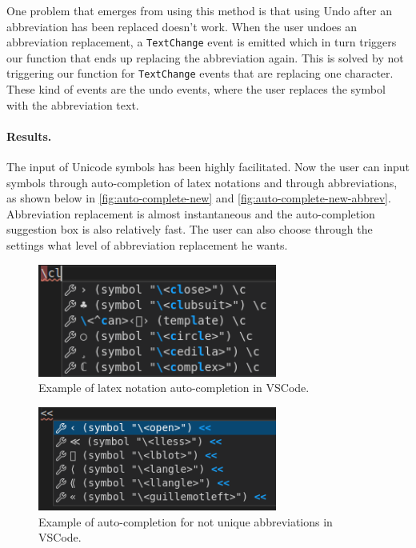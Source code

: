 One problem that emerges from using this method is that using Undo after an abbreviation has been replaced doesn't work. When the user undoes an abbreviation replacement, a \texttt{TextChange} event is emitted which in turn triggers our function that ends up replacing the abbreviation again. This is solved by not triggering our function for \texttt{TextChange} events that are replacing one character. These kind of events are the undo events, where the user replaces the symbol with the abbreviation text.

\paragraph{Results.}
The input of Unicode symbols has been highly facilitated. Now the user can input symbols through auto-completion of latex notations and through abbreviations, as shown below in \autoref{fig:auto-complete-new} and \autoref{fig:auto-complete-new-abbrev}. Abbreviation replacement is almost instantaneous and the auto-completion suggestion box is also relatively fast. The user can also choose through the settings what level of abbreviation replacement he wants.

\begin{figure}[htbp]
    \centering
    \includegraphics[width=0.7\textwidth]{figures/problem3/vscode_new_autocomplete.png}
    \caption{Example of latex notation auto-completion in VSCode.}
    \label{fig:auto-complete-new}
\end{figure}

\begin{figure}[htbp]
    \centering
    \includegraphics[width=0.7\textwidth]{figures/problem3/vscode_abbreviation_autocomplete.png}
    \caption{Example of auto-completion for not unique abbreviations in VSCode.}
    \label{fig:auto-complete-new-abbrev}
\end{figure}